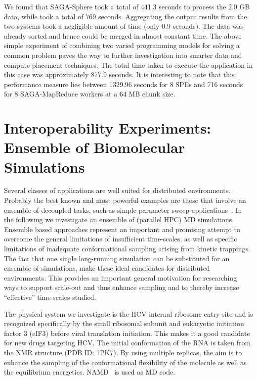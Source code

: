 \documentclass[3p,twocolumn]{elsarticle}
\begin{document}
We found that SAGA-Sphere took a total of 441.3 seconds to process the
2.0 GB data, while \sagamapreduce took a total of 769
seconds. Aggregating the output results from the two systems took a
negligible amount of time (only 0.9 seconds). The data was already
sorted and hence could be merged in almost constant
time. %
The above simple experiment of combining two varied programming models
for solving a common problem paves the way to further investigation
into smarter data and compute placement techniques.  The total time
taken to execute the \wc application in this case was approximately
877.9 seconds. It is interesting to note that this performance measure
lies between 1329.96 seconds for 8 SPEs and 716 seconds for 8
SAGA-MapReduce workers at a 64 MB chunk size.

\section{Interoperability Experiments: Ensemble of Biomolecular
  Simulations}

Several classes of applications are well suited for distributed
environments. Probably the best known and most powerful examples are
those that involve an ensemble of decoupled tasks, such as simple
parameter sweep applications~\cite{1239909}. In the following
we investigate an ensemble of (parallel HPC) MD simulations. 
Ensemble based approaches represent an important and promising attempt
to overcome the general limitations of insufficient time-scales, as
well as specific limitations of inadequate conformational sampling
arising from kinetic trappings.  The fact that one single long-running
simulation can be substituted for an ensemble of simulations, make
these ideal candidates for distributed environments.  This 
provides an important general motivation for researching ways to
support scale-out and thus enhance sampling and to thereby increase
``effective'' time-scales studied.

The physical system we investigate is the HCV internal ribosome entry 
site and is recognized specifically by the small ribosomal subunit and 
eukaryotic initiation factor 3 (eIF3) before viral translation initiation.  
This makes it a good candidate for new drugs targeting HCV. 
The initial conformation of the RNA is taken from the NMR
structure (PDB ID: 1PK7).  By using multiple replicas, the aim is to
enhance the sampling of the conformational flexibility of the molecule
as well as the equilibrium energetics. NAMD~\cite{Phillips:2005gd} is
used as MD code.
\end{document}
